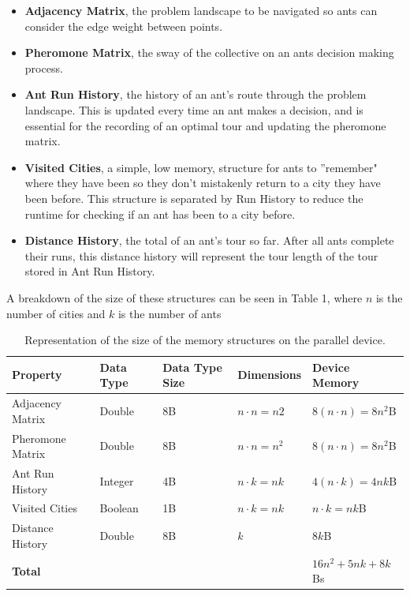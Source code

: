 \documentclass[11pt]{report}
\begin{document}
            \begin{itemize}
                \item \textbf{Adjacency Matrix}, the problem landscape to be navigated so ants can consider the edge weight between points.
                \item \textbf{Pheromone Matrix}, the sway of the collective on an ants decision making process.
                \item \textbf{Ant Run History}, the history of an ant's route through the problem landscape. This is updated every time an ant makes a decision, and is essential for the recording of an optimal tour and updating the pheromone matrix.
                \item \textbf{Visited Cities}, a simple, low memory, structure for ants to ''remember" where they have been so they don't mistakenly return to a city they have been before. This structure is separated by Run History to reduce the runtime for checking if an ant has been to a city before.
                \item \textbf{Distance History}, the total of an ant's tour so far. After all ants complete their runs, this distance history will represent the tour length of the tour stored in Ant Run History.
            \end{itemize}
            
            A breakdown of the size of these structures can be seen in Table 1, where $n$ is the number of cities and $k$ is the number of ants
            
            \begin{table}[]
            \centering
            \caption{Representation of the size of the memory structures on the parallel device.}
            \begin{tabular}{|l|l|l|l|l|}
            \hline
            Property         & Data Type                & Data Type Size           & Dimensions               & Device Memory   \\\hline
            Adjacency Matrix & Double                   & 8B                       & $n \cdot n = n2$               & $8(n \cdot n) = 8n^2$B  \\\hline
            Pheromone Matrix & Double                   & 8B                       & $n \cdot n = n^2$               & $8(n \cdot n) = 8n^2$B  \\\hline
            Ant Run History  & Integer                  & 4B                       & $n \cdot k = nk$               & $4(n \cdot k) = 4nk$B  \\\hline
            Visited Cities   & Boolean                  & 1B                       & $n \cdot k = nk$               & $n \cdot k = nk$B      \\\hline
            Distance History & Double                   & 8B                       & $k$                        & $8k$B              \\\hline
            \textbf{Total}   & \cellcolor[HTML]{9E9E9E} & \cellcolor[HTML]{9E9E9E} & \cellcolor[HTML]{9E9E9E} & $16n^2 + 5nk + 8k$Bs \\\hline
            \end{tabular}
            \end{table}
\end{document}
